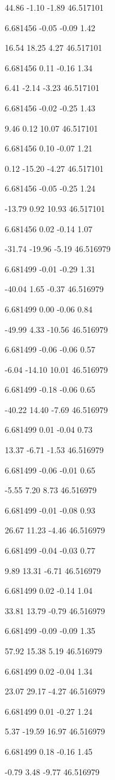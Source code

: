 44.86
-1.10
-1.89
46.517101

6.681456
-0.05
-0.09
1.42

16.54
18.25
4.27
46.517101

6.681456
0.11
-0.16
1.34

6.41
-2.14
-3.23
46.517101

6.681456
-0.02
-0.25
1.43

9.46
0.12
10.07
46.517101

6.681456
0.10
-0.07
1.21

0.12
-15.20
-4.27
46.517101

6.681456
-0.05
-0.25
1.24

-13.79
0.92
10.93
46.517101

6.681456
0.02
-0.14
1.07

-31.74
-19.96
-5.19
46.516979

6.681499
-0.01
-0.29
1.31

-40.04
1.65
-0.37
46.516979

6.681499
0.00
-0.06
0.84

-49.99
4.33
-10.56
46.516979

6.681499
-0.06
-0.06
0.57

-6.04
-14.10
10.01
46.516979

6.681499
-0.18
-0.06
0.65

-40.22
14.40
-7.69
46.516979

6.681499
0.01
-0.04
0.73

13.37
-6.71
-1.53
46.516979

6.681499
-0.06
-0.01
0.65

-5.55
7.20
8.73
46.516979

6.681499
-0.01
-0.08
0.93

26.67
11.23
-4.46
46.516979

6.681499
-0.04
-0.03
0.77

9.89
13.31
-6.71
46.516979

6.681499
0.02
-0.14
1.04

33.81
13.79
-0.79
46.516979

6.681499
-0.09
-0.09
1.35

57.92
15.38
5.19
46.516979

6.681499
0.02
-0.04
1.34

23.07
29.17
-4.27
46.516979

6.681499
0.01
-0.27
1.24

5.37
-19.59
16.97
46.516979

6.681499
0.18
-0.16
1.45

-0.79
3.48
-9.77
46.516979

